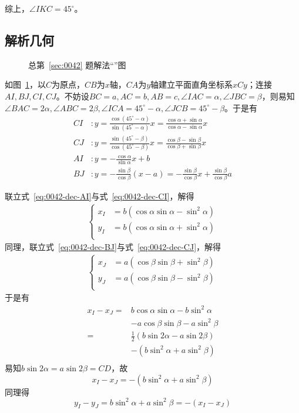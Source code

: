综上，$\angle IKC = 45^\circ$。

\subsection{解析几何} \label{subsec:0042-dec}

\begin{figure}[htbp]
  \centering
  \caption{总第~\ref{sec:0042} 题解法“”图}
  \label{fig:0042-dec}
\end{figure}

如图~\ref{fig:0042-dec}，以$C$为原点，$CB$为$x$轴，$CA$为$y$轴建立平面直角坐标系$xCy$；连接$AI, BJ, CI, CJ$。不妨设$BC = a, AC = b, AB = c, \angle IAC = \alpha, \angle JBC = \beta$，则易知$\angle BAC = 2\alpha, \angle ABC = 2\beta, \angle ICA = 45^\circ - \alpha, \angle JCB = 45^\circ - \beta$。于是有
\begin{align}
  CI&: y = \frac{\cos(45^\circ - \alpha)}{\sin(45^\circ - \alpha)}x = \frac{\cos\alpha + \sin\alpha}{\cos\alpha - \sin\alpha}x \label{eq:0042-dec-CI} \\
  CJ&: y = \frac{\sin(45^\circ - \beta)}{\cos(45^\circ - \beta)}x = \frac{\cos\beta - \sin\beta}{\cos\beta + \sin\beta}x \label{eq:0042-dec-CJ} \\
  AI&: y = -\frac{\cos\alpha}{\sin\alpha}x + b \label{eq:0042-dec-AI} \\
  BJ&: y = -\frac{\sin\beta}{\cos\beta}(x - a) = -\frac{\sin\beta}{\cos\beta}x + \frac{\sin\beta}{\cos\beta}a \label{eq:0042-dec-BJ}
\end{align}

联立式~\ref{eq:0042-dec-AI}与式~\ref{eq:0042-dec-CI}，解得
\begin{align}
  \left\{\begin{aligned}
    x_I &= b(\cos\alpha\sin\alpha - \sin^2\alpha) \\
    y_I &= b(\cos\alpha\sin\alpha + \sin^2\alpha) \\
  \end{aligned}\right. \label{eq:0042-dec-I}
\end{align}
同理，联立式~\ref{eq:0042-dec-BJ}与式~\ref{eq:0042-dec-CJ}，解得
\begin{align}
  \left\{\begin{aligned}
    x_J &= a(\cos\beta\sin\beta + \sin^2\beta) \\
    y_J &= a(\cos\beta\sin\beta - \sin^2\beta) \\
  \end{aligned}\right. \label{eq:0042-dec-J}
\end{align}
于是有
\begin{align*}
  x_I - x_J ={}& b\cos\alpha\sin\alpha - b\sin^2\alpha \\
  &- a\cos\beta\sin\beta - a\sin^2\beta \\
  ={}& \frac12(b\sin2\alpha - a\sin2\beta) \\
  &- (b\sin^2\alpha + a\sin^2\beta) \\
\end{align*}
易知$b\sin2\alpha = a\sin2\beta = CD$，故
\[ x_I - x_J = -(b\sin^2\alpha + a\sin^2\beta) \]
同理得
\[ y_I - y_J = b\sin^2\alpha + a\sin^2\beta = -(x_I - x_J) \]

